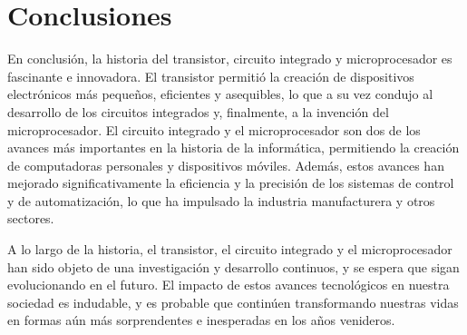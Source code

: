 \documentclass{article}
\begin{document}
\newpage
\section*{Conclusiones}

En conclusión, la historia del transistor, circuito integrado y microprocesador es fascinante e innovadora.  
El transistor permitió la creación de dispositivos electrónicos más pequeños, eficientes y asequibles, 
lo que a su vez condujo al desarrollo de los circuitos integrados y, finalmente, a la invención del microprocesador.
El circuito integrado y el microprocesador son dos de los avances más importantes en la historia de la informática, 
permitiendo la creación de computadoras personales y dispositivos móviles. Además, estos avances han mejorado 
significativamente la eficiencia y la precisión de los sistemas de control y de automatización, lo que ha 
impulsado la industria manufacturera y otros sectores.

A lo largo de la historia, el transistor, el circuito integrado y el microprocesador han sido objeto de una investigación 
y desarrollo continuos, y se espera que sigan evolucionando en el futuro. El impacto de estos avances tecnológicos 
en nuestra sociedad es indudable, y es probable que continúen transformando nuestras vidas 
en formas aún más sorprendentes e inesperadas en los años venideros.




\end{document}
